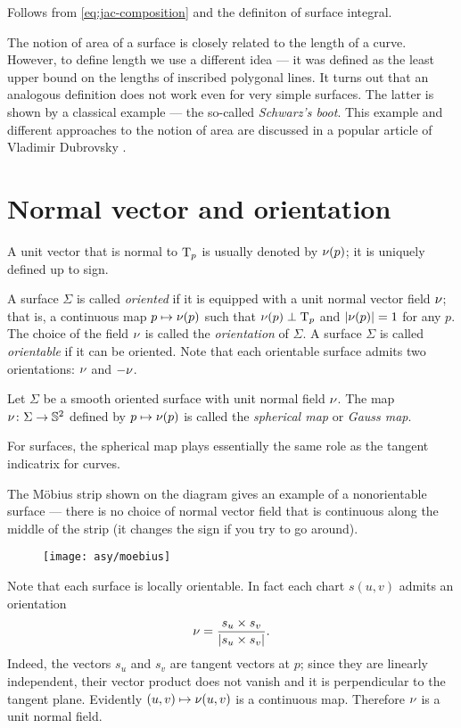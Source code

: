 Follows from \ref{eq:jac-composition} and the definiton of surface integral.
\qeds

The notion of area of a surface is closely related to the length of a curve.
However, to define length we use a different idea --- it was defined as the least upper bound on the lengths of inscribed polygonal lines.
It turns out that an analogous definition does not work even for very simple surfaces.
The latter is shown by a classical example --- the so-called \emph{Schwarz's boot}.
This example and different approaches to the notion of area are discussed in a popular article of Vladimir Dubrovsky \cite{dubrovsky}.

\section{Normal vector and orientation}
A unit vector that is normal to $\mathrm{T}_p$ is usually denoted by $\nu(p)$;
it is uniquely defined up to sign.

A surface $\Sigma$ is called \emph{oriented} if it is equipped with a unit normal vector field $\nu$;
that is, a continuous map $p\mapsto \nu(p)$ such that $\nu(p)\perp\mathrm{T}_p$ and $|\nu(p)|=1$ for any $p$.
The choice of the field $\nu$ is called the \emph{orientation} of $\Sigma$.
A surface $\Sigma$ is called \emph{orientable} if it can be oriented.
Note that each orientable surface admits two orientations: $\nu$ and $-\nu$.

Let $\Sigma$ be a smooth oriented surface with unit normal field $\nu$.
The map $\nu\colon\Sigma\to \mathbb{S}^2$ defined by $p\mapsto \nu(p)$ is called the \emph{spherical map} or \emph{Gauss map}.

For surfaces, the spherical map plays essentially the same role as the tangent indicatrix for curves.

The M\"obius strip shown on the diagram gives an example of a nonorientable surface --- there is no choice of normal vector field that is continuous along the middle of the strip (it changes the sign if you try to go around).

\begin{wrapfigure}{o}{42 mm}
\vskip-0mm
\centering
\texttt{[image: asy/moebius]}
\vskip0mm
\end{wrapfigure}

Note that each surface is locally orientable.
In fact each chart $s(u,v)$ admits an orientation 
\[\nu=
\frac{s_u\times s_v}
{\left|s_u\times s_v\right|}.\]
Indeed, the vectors $s_u$ and $s_v$ are tangent vectors at $p$; 
since they are linearly independent, their vector product does not vanish and it is perpendicular to the tangent plane.
Evidently $(u,v)\mapsto \nu(u,v)$ is a continuous map.
Therefore $\nu$ is a unit normal field. 

